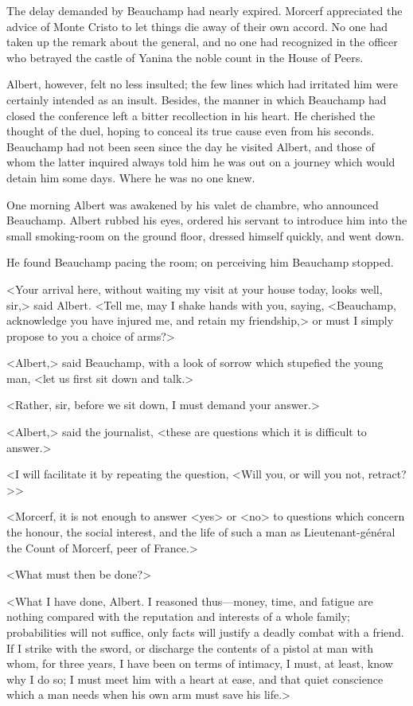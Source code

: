  The delay demanded by Beauchamp had nearly expired. Morcerf appreciated the advice of Monte Cristo to let things die away of their own accord. No one had taken up the remark about the general, and no one had recognized in the officer who betrayed the castle of Yanina the noble count in the House of Peers. 

 Albert, however, felt no less insulted; the few lines which had irritated him were certainly intended as an insult. Besides, the manner in which Beauchamp had closed the conference left a bitter recollection in his heart. He cherished the thought of the duel, hoping to conceal its true cause even from his seconds. Beauchamp had not been seen since the day he visited Albert, and those of whom the latter inquired always told him he was out on a journey which would detain him some days. Where he was no one knew. 

 One morning Albert was awakened by his valet de chambre, who announced Beauchamp. Albert rubbed his eyes, ordered his servant to introduce him into the small smoking-room on the ground floor, dressed himself quickly, and went down. 

 He found Beauchamp pacing the room; on perceiving him Beauchamp stopped. 

 <Your arrival here, without waiting my visit at your house today, looks well, sir,> said Albert. <Tell me, may I shake hands with you, saying, <Beauchamp, acknowledge you have injured me, and retain my friendship,> or must I simply propose to you a choice of arms?> 

 <Albert,> said Beauchamp, with a look of sorrow which stupefied the young man, <let us first sit down and talk.> 

 <Rather, sir, before we sit down, I must demand your answer.> 

 <Albert,> said the journalist, <these are questions which it is difficult to answer.> 

 <I will facilitate it by repeating the question, <Will you, or will you not, retract?>> 

 <Morcerf, it is not enough to answer <yes> or <no> to questions which concern the honour, the social interest, and the life of such a man as Lieutenant-général the Count of Morcerf, peer of France.> 

 <What must then be done?>

<What I have done, Albert. I reasoned thus—money, time, and fatigue are nothing compared with the reputation and interests of a whole family; probabilities will not suffice, only facts will justify a deadly combat with a friend. If I strike with the sword, or discharge the contents of a pistol at man with whom, for three years, I have been on terms of intimacy, I must, at least, know why I do so; I must meet him with a heart at ease, and that quiet conscience which a man needs when his own arm must save his life.> 

